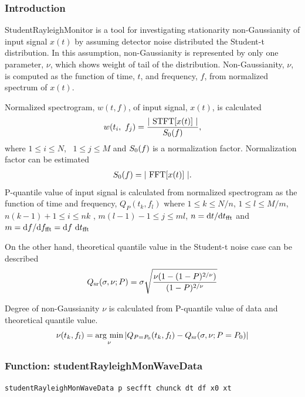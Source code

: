\subsubsection{\bf Introduction}
StudentRayleighMonitor is a tool for investigating stationarity non-Gaussianity of input signal $x(t)$
by assuming detector noise distributed the Student-t distribution.
In this assumption, non-Gaussianity is represented by only one parameter, $\nu$, which shows weight of tail of the distribution.
Non-Gaussianity, $\nu$, is computed as the function of time, $t$, and frequency, $f$, from normalized spectrum of $x(t)$.

Normalized spectrogram, $w(t, f)$, of input signal, $x(t)$, is calculated
\begin{align*}
  w(t_i,~f_j) = \frac{ |~{\rm STFT}[x(t)]~| }{S_{\rm 0}(f)},
\end{align*}
where $1\leq i\leq N$, ~$1\leq j\leq M$ and $S_{\rm 0}(f)$ is a normalization factor.
Normalization factor can be estimated
\begin{align*}
  S_{\rm 0}(f) = |~{\rm FFT}[x(t)]~|.
\end{align*}
P-quantile value of input signal is calculated from normalized spectrogram as the function of time and frequency,
$Q_{P}(t_k, f_l)$ where $1\leq k\leq N/n$, $1\leq l\leq M/m$, $n(k-1)+1\leq i\leq nk$ ,
$m(l-1)-1\leq j\leq ml$, $n = {\rm d}t/{\rm d}t_{\rm fft}$ and $m = {\rm d}f/{\rm d}f_{\rm fft} = {\rm d}f~{\rm d}t_{\rm fft}$

On the other hand, theoretical quantile value in the Student-t noise case can be described
\begin{align*}
  Q_{\rm sr}(\sigma,\nu;P) = \sigma\sqrt{\frac{\nu(1-(1-P)^{2/\nu})}{(1-P)^{2/\nu}}}
\end{align*}

Degree of non-Gaussianity $\nu$ is calculated from P-quantile value of data and theoretical quantile value.
\begin{align*}
  \nu(t_k, f_l) = \mathop{\rm arg~min}\limits_{\nu} | Q_{P=P_0}(t_k,f_l) - Q_{\rm sr}(\sigma,\nu;P=P_0)|
\end{align*}

\subsubsection{{\bf Function:} studentRayleighMonWaveData}
{\tt studentRayleighMonWaveData p secfft chunck dt df x0 xt\\}

